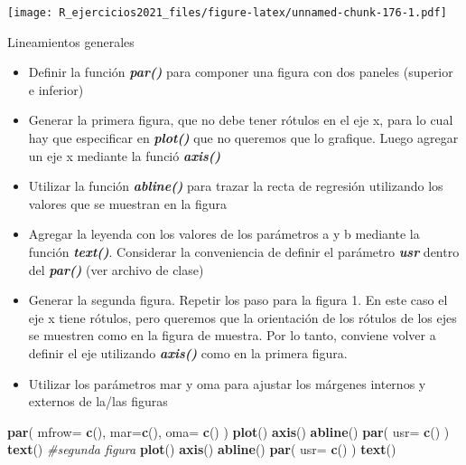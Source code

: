 \documentclass[]{book}
\newenvironment{Shaded}{\begin{snugshade}}{\end{snugshade}}
\newcommand{\CommentTok}[1]{\textcolor[rgb]{0.56,0.35,0.01}{\textit{#1}}}
\newcommand{\DataTypeTok}[1]{\textcolor[rgb]{0.13,0.29,0.53}{#1}}
\newcommand{\KeywordTok}[1]{\textcolor[rgb]{0.13,0.29,0.53}{\textbf{#1}}}
\newcommand{\NormalTok}[1]{#1}
\providecommand{\tightlist}{%
  \setlength{\itemsep}{0pt}\setlength{\parskip}{0pt}}
\begin{document}
\texttt{[image: R\_ejercicios2021\_files/figure-latex/unnamed-chunk-176-1.pdf]}

Lineamientos generales

\begin{itemize}
\tightlist
\item
  Definir la función \emph{\textbf{par()}} para componer una figura con dos paneles (superior e inferior)\\
\item
  Generar la primera figura, que no debe tener rótulos en el eje x, para lo cual hay que especificar en \emph{\textbf{plot()}} que no queremos que lo grafique. Luego agregar un eje x mediante la funció \emph{\textbf{axis()}}
\item
  Utilizar la función \emph{\textbf{abline()}} para trazar la recta de regresión utilizando los valores que se muestran en la figura\\
\item
  Agregar la leyenda con los valores de los parámetros a y b mediante la función \emph{\textbf{text()}}. Considerar la conveniencia de definir el parámetro \emph{\textbf{usr}} dentro del \emph{\textbf{par()}} (ver archivo de clase)\\
\item
  Generar la segunda figura. Repetir los paso para la figura 1. En este caso el eje x tiene rótulos, pero queremos que la orientación de los rótulos de los ejes se muestren como en la figura de muestra. Por lo tanto, conviene volver a definir el eje utilizando \emph{\textbf{axis()}} como en la primera figura.\\
\item
  Utilizar los parámetros mar y oma para ajustar los márgenes internos y externos de la/las figuras
\end{itemize}

\begin{Shaded}
\begin{Highlighting}[]
\KeywordTok{par}\NormalTok{( }\DataTypeTok{mfrow=} \KeywordTok{c}\NormalTok{(), }\DataTypeTok{mar=}\KeywordTok{c}\NormalTok{(), }\DataTypeTok{oma=} \KeywordTok{c}\NormalTok{() )}
\KeywordTok{plot}\NormalTok{()}
\KeywordTok{axis}\NormalTok{()}
\KeywordTok{abline}\NormalTok{()}
\KeywordTok{par}\NormalTok{( }\DataTypeTok{usr=} \KeywordTok{c}\NormalTok{() )}
\KeywordTok{text}\NormalTok{()}
\CommentTok{#segunda figura}
\KeywordTok{plot}\NormalTok{()}
\KeywordTok{axis}\NormalTok{()}
\KeywordTok{abline}\NormalTok{()}
\KeywordTok{par}\NormalTok{( }\DataTypeTok{usr=} \KeywordTok{c}\NormalTok{() )}
\KeywordTok{text}\NormalTok{()}
\end{Highlighting}
\end{Shaded}
\end{document}
